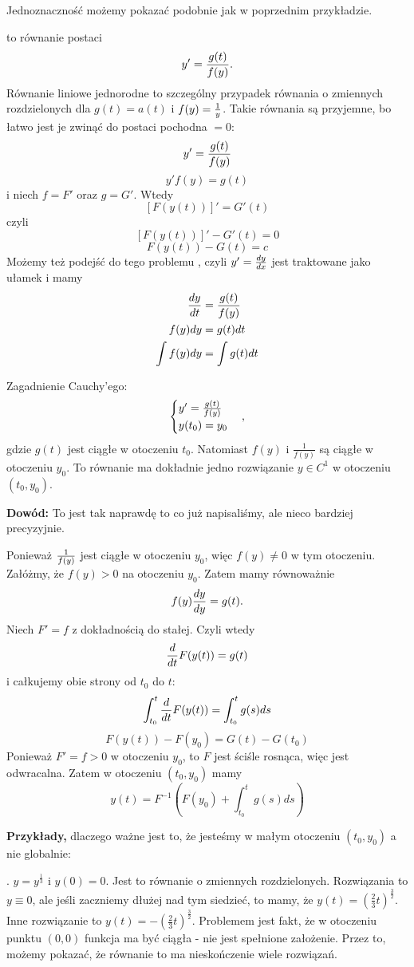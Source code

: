 Jednoznaczność możemy pokazać podobnie jak w poprzednim przykładzie.
\medskip

\medskip

 to równanie postaci
$$y'={g(t)\over f(y)}.$$
Równanie liniowe jednorodne to szczególny przypadek równania o zmiennych rozdzielonych dla $g(t)=a(t)$ i $f(y)={1\over y}$. Takie równania są przyjemne, bo łatwo jest je zwinąć do postaci pochodna $=0$:
$$y'={g(t)\over f(y)}$$
$$y'f(y)=g(t)$$
i niech $f=F'$ oraz $g=G'$. Wtedy
$$[F(y(t))]'=G'(t)$$
czyli
$$[F(y(t))]'-G'(t)=0$$
$$F(y(t))-G(t)=c$$
Możemy też podejść do tego problemu , czyli $y'={dy\over dx}$ jest traktowane jako ułamek i mamy
\begin{align*}
    {dy\over dt}&={g(t)\over f(y)}\\
    f(y)dy&=g(t)dt\\
    \int f(y)dy&=\int g(t)dt
\end{align*}

 Zagadnienie Cauchy'ego:
$$\begin{cases}y'={g(t)\over f(y)}\\y(t_0)=y_0\end{cases},$$
gdzie $g(t)$ jest ciągłe w otoczeniu $t_0$. Natomiast $f(y)$ i $\frac1{f(y)}$ są ciągłe w otoczeniu $y_0$. To równanie ma dokładnie jedno rozwiązanie $y\in C^1$ w otoczeniu $(t_0,y_0)$.

\textbf{Dowód:} To jest tak naprawdę to co już napisaliśmy, ale nieco bardziej precyzyjnie.

Ponieważ ${1\over f(y)}$ jest ciągłe w otoczeniu $y_0$, więc $f(y)\neq 0$ w tym otoczeniu. Załóżmy, że $f(y)>0$ na otoczeniu $y_0$. Zatem mamy równoważnie
$$f(y){dy\over dy}=g(t).$$
Niech $F'=f$ z dokładnością do stałej. Czyli wtedy
$${d\over dt}F(y(t))=g(t)$$
i całkujemy obie strony od ${t_0}$ do $t$:
$$\int_{t_0}^t{d\over dt}F(y(t))=\int_{t_0}^tg(s)ds$$
$$F(y(t))-F(y_0)=G(t)-G(t_0)$$
Ponieważ $F'=f>0$ w otoczeniu $y_0$, to $F$ jest ściśle rosnąca, więc jest odwracalna. Zatem w otoczeniu $(t_0, y_0)$ mamy
$$y(t)=F^{-1}(F(y_0)+\int_{t_0}^tg(s)ds)$$

\textbf{Przykłady,} dlaczego ważne jest to, że jesteśmy w małym otoczeniu $(t_0, y_0)$ a nie globalnie:

. $y=y^\frac13$ i $y(0)=0$. Jest to równanie o zmiennych rozdzielonych. Rozwiązania to $y\equiv 0$, ale jeśli zaczniemy dłużej nad tym siedzieć, to mamy, że $y(t)=\left(\frac23t\right)^\frac32$. Inne rozwiązanie to $y(t)=-\left(\frac23t\right)^\frac32$. Problemem jest fakt, że w otoczeniu punktu $(0, 0)$ funkcja ma być ciągła - nie jest spełnione założenie. Przez to, możemy pokazać, że równanie to ma nieskończenie wiele rozwiązań.

